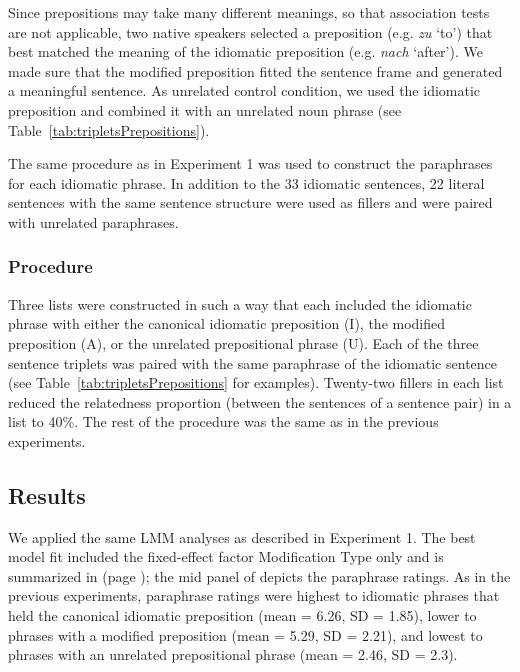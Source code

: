 \documentclass[output=paper]{langsci/langscibook}
\begin{document}
Since prepositions may take many different meanings, so that association tests are not applicable, two native speakers selected a preposition (e.g. \textit{zu} ‘to’) that best matched the meaning of the idiomatic preposition (e.g. \textit{nach} ‘after’). We made sure that the modified preposition fitted the sentence frame and generated a meaningful sentence. As unrelated control condition, we used the idiomatic preposition and combined it with an unrelated noun phrase (see Table~\ref{tab:tripletsPrepositions}). 

The same procedure as in Experiment 1 was used to construct the paraphrases for each idiomatic phrase. In addition to the 33 idiomatic sentences, 22 literal sentences with the same sentence structure were used as fillers and were paired with unrelated paraphrases.

\subsubsection{Procedure}

Three lists were constructed in such a way that each included the idiomatic phrase with either the canonical idiomatic preposition (I), the modified preposition (A), or the unrelated prepositional phrase (U). Each of the three sentence triplets was paired with the same paraphrase of the idiomatic sentence (see Table~\ref{tab:tripletsPrepositions} for examples). Twenty-two fillers in each list reduced the relatedness proportion (between the sentences of a sentence pair) in a list to 40\%. The rest of the procedure was the same as in the previous experiments. 

\subsection{Results}

We applied the same LMM analyses as described in Experiment 1. The best model fit included the fixed-effect factor Modification Type only and is summarized in  (page \pageref{tab:Table7}); the mid panel of  depicts the paraphrase ratings. As in the previous experiments, paraphrase ratings were highest to idiomatic phrases that held the canonical idiomatic preposition (mean = 6.26, SD = 1.85), lower to phrases with a modified preposition (mean = 5.29, SD = 2.21), and lowest to phrases with an unrelated prepositional phrase (mean = 2.46, SD = 2.3).
\end{document}
